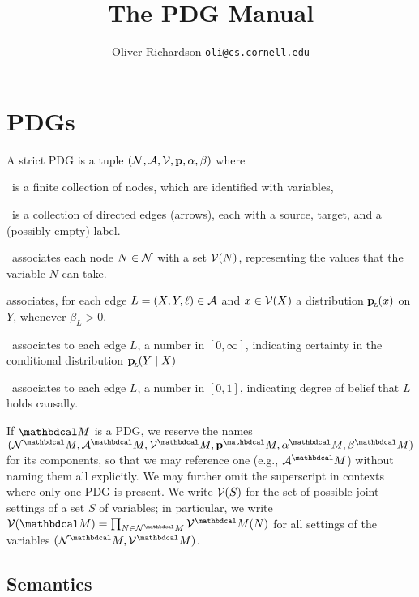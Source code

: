 \documentclass{article}
\title{The PDG Manual}
\author{Oliver Richardson  \texttt{oli@cs.cornell.edu}}
\begin{document}
	\maketitle
	\tableofcontents
	\clearpage
	
	\section{PDGs}
	\def\pdgvars[#1]{(\N#1, \Ed#1, \V#1, \mat p#1, \alpha#1,\beta#1)}
	\begin{defn}[sPDG]\label{def:sPDG}
		A strict PDG is a tuple $\pdgvars[]$ where
		\begin{description}[nosep]
			\item[$\N$]~is a finite collection of nodes, which are identified with variables,
			\item[$\Ed$]~is a collection of directed edges (arrows), each with a source, target, and a (possibly empty) label.
			\item[$\V$]~associates each node $N \in \mathcal N$ with a set $\mathcal V(N)$,
			representing the values that the variable $N$ can take. 
			\item[$\mathbf p$] associates, for each edge $L = (X,Y, \ell) \in \mathcal A$ and $x \in \mathcal V(X)$ a distribution $\mathbf{p}_{\!_L\!}(x)$ on $Y$, whenever $\beta_L > 0$.
			\item[$\beta$]~associates to each edge $L$, a number in $[0,\infty]$, indicating certainty in the conditional distribution $\mathbf{p}_{\!_L\!}(Y \mid X)$ 
			\item[$\alpha$]~associates to each edge $L$, a number in $[0,1]$, indicating degree of belief that $L$ holds causally.
		\end{description}
		\vspace{-1.4em}
	\end{defn}

	If $\dg M$ is a PDG, we reserve the names $\pdgvars[^\dg M]$
	for its components, so that we may reference one (e.g.,
	$\Ed^\dg M$) without naming them all explicitly. We may further omit the superscript in contexts where only one PDG is present. 
	We write $\mathcal V(S)$ for the set of possible joint settings of a set $S$
	of variables; in particular, 
	we write $\V(\dg M)
	= \prod_{N \in \N^\dg M} \V^\dg M(N)$
	for all settings of the variables $(\N^\dg M, \V^\dg M)$.
	
	\subsection{Semantics}
\end{document}

